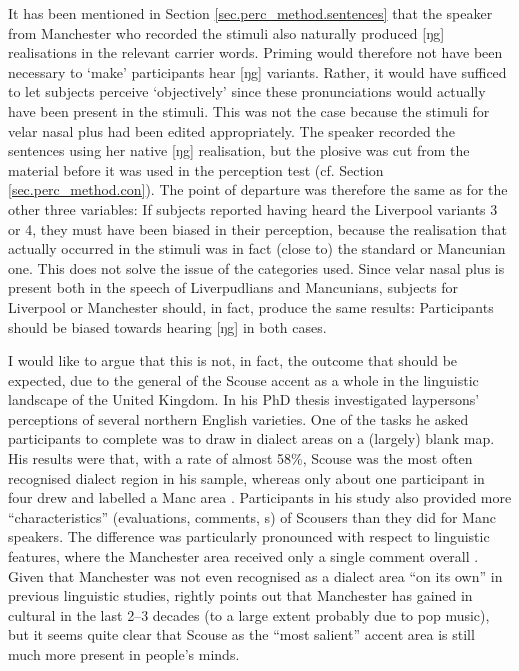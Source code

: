 It has been mentioned in Section \ref{sec.perc_method.sentences} that the speaker from Manchester who recorded the stimuli also naturally produced [ŋg] realisations in the relevant carrier words.
Priming would therefore not have been necessary to `make' participants hear [ŋg] variants.
Rather, it would have sufficed to let subjects perceive `objectively' since these pronunciations would actually have been present in the stimuli.
This was not the case because the stimuli for velar nasal plus had been edited appropriately.
The speaker recorded the sentences using her native [ŋg] realisation, but the plosive was cut from the material before it was used in the perception test (cf. Section \ref{sec.perc_method.con}).
The point of departure was therefore the same as for the other three variables: If subjects reported having heard the Liverpool variants 3 or 4, they must have been biased in their perception, because the realisation that actually occurred in the stimuli was in fact (close to) the standard or Mancunian one.
This does not solve the issue of the  categories used.
Since velar nasal plus is present both in the speech of Liverpudlians and Mancunians,  subjects for Liverpool or Manchester should, in fact, produce the same results: Participants should be biased towards hearing [ŋg] in both cases.

I would like to argue that this is not, in fact, the outcome that should be expected, due to the general  of the Scouse accent as a whole in the linguistic landscape of the United Kingdom.
In his \citeyear{montgomery2007} PhD thesis \citeauthor{montgomery2007} investigated laypersons' perceptions of several northern English varieties.
One of the tasks he asked participants to complete was to draw in dialect areas on a (largely) blank map.
His results were that, with a rate of almost 58\%, Scouse was the most often recognised dialect region in his sample, whereas only about one participant in four drew and labelled a Manc area \parencite[cf.][194]{montgomery2007}.
Participants in his study also provided more ``characteristics'' (evaluations, comments, s) of Scousers than they did for Manc speakers.
The difference was particularly pronounced with respect to linguistic features, where the Manchester area received only a single comment overall \parencite[cf.][246--252]{montgomery2007}.
Given that Manchester was not even recognised as a dialect area ``on its own'' in previous linguistic studies, \textcite[cf.][214--215]{montgomery2007} rightly points out that Manchester has gained in cultural  in the last 2--3 decades (to a large extent probably due to pop music), but it seems quite clear that Scouse as the ``most salient'' \parencite[216]{montgomery2007} accent area is still much more present in people's minds.

